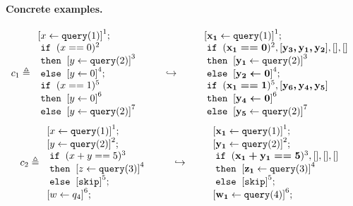 \documentclass[a4paper,11pt]{article}
\begin{document}
\paragraph{Concrete examples.}
\[
c_1 \triangleq
\begin{array}{l}
     \left[x \leftarrow \query(1) \right]^1; \\
     \eif \; (x ==0)^{2} \; \\
    \ethen \; \left[y \leftarrow \query(2) \right]^3\; \\
    \eelse \; \left[y \leftarrow 0 \right]^4 ; \\
    \eif \; (x == 1 )^5\; \\
    \ethen \; \left[ y \leftarrow 0 \right]^6\; \\
    \eelse \; \left[y \leftarrow \query(2) \right]^7\\
\end{array}
%
%
\hspace{20pt} \hookrightarrow  \hspace{20pt}
%
\begin{array}{l}
     \left[ \ssa{x_1} \leftarrow \query(1) \right]^1; \\
     \eif \; (\ssa{x_1 ==0})^{2}, [\ssa{ y_3, y_1,y_2  }],[],[]  \; \\
    \ethen \; \left[ \ssa{y_1} \leftarrow \query(2) \right]^3\; \\
    \eelse \; \left[\ssa{y_2 \leftarrow 0 } \right]^4 ; \\
    \eif \; (\ssa{x_1 == 1} )^{5} , [\ssa{ y_6, y_4, y_5 } ] \; \\
    \ethen \; \left[ \ssa{y_4 \leftarrow 0} \right]^6\; \\
    \eelse \; \left[\ssa{y_5} \leftarrow \query(2) \right]^7\\
\end{array}
\]
\[
c_2 \triangleq
\begin{array}{l}
   \left[ x \leftarrow \query(1) \right]^1; \\
   \left[y \leftarrow \query(2) \right]^2 ; \\
    \eif \;( x + y == 5 )^3\; \\
    \ethen \;\left[ z \leftarrow \query(3)\right]^4 \; \\
    \eelse \;\left[ \ssa{\eskip}\right]^5 ; \\
   \left[ w \leftarrow q_4 \right]^6; \\
\end{array}
\hspace{20pt} \hookrightarrow \hspace{20pt}
%
\begin{array}{l}
   \left[ \ssa{ x_1 } \leftarrow \query(1) \right]^1; \\
   \left[\ssa{ y_1} \leftarrow \query(2) \right]^2 ; \\
    \eif \;( \ssa{ x_1 + y_1 == 5} )^3, [ ],[] ,[ ]\; \\
    \ethen \;\left[ \ssa{ z_1 }
    \leftarrow \query(3)\right]^4 \; \\
    \eelse \;\left[ \eskip\right]^5 ; \\
   \left[ \ssa{ w_1} \leftarrow \query(4) \right]^6; \\
\end{array}
\]
\end{document}
